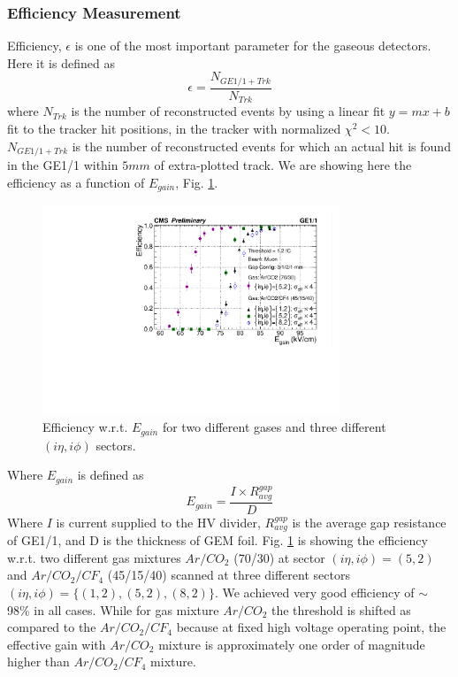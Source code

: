 \subsubsection{Efficiency Measurement}
Efficiency, $\epsilon$ is one of the most important parameter for the gaseous detectors. Here it is defined as 
\begin{equation}
\epsilon = \frac{N_{GE1/1+Trk}}{N_{Trk}}
\end{equation}
where $N_{Trk}$ is the number of reconstructed events by using a linear fit $y = mx + b$ fit to the tracker hit positions, in the tracker with normalized $\chi^2<10$.
$N_{GE1/1+Trk}$ is the number of reconstructed events for which an actual hit is found in the GE1/1 within $5mm$ of extra-plotted track.
We are showing here the efficiency as a function of $E_{gain}$, Fig. \ref{Efficiency}. 
\begin{figure}[!htbp]
\centering
\includegraphics[width=3.5in]{figures/GEM/EfficiencyPlot_wrt_EGain_wError4times_2gas.pdf}
\caption{Efficiency w.r.t. $E_{gain}$ for two different gases and three different $(i\eta,i\phi)$ sectors.}
\label{Efficiency}
\end{figure}
Where $E_{gain}$ is defined as
\begin{equation}
E_{gain} = \frac{I\times R_{avg}^{gap}}{D}
\end{equation}
Where $I$ is current supplied to the HV divider,
      $R_{avg}^{gap}$ is the average gap resistance of GE1/1,
      and D is the thickness of GEM foil.
      Fig. \ref{Efficiency} is showing the efficiency w.r.t. two different gas mixtures $Ar/CO_2$ (70/30) at sector $(i\eta,i\phi)=(5,2)$ and $Ar/CO_2/CF_4$ (45/15/40) scanned at three different sectors $(i\eta,i\phi)=\{(1,2),(5,2),(8,2)\}$. We achieved very good efficiency of $\sim$ 98\% in all cases. While for gas mixture $Ar/CO_2$ the threshold is shifted as compared to the $Ar/CO_2/CF_4$ because at fixed high voltage operating point, the effective gain with $Ar/CO_2$  mixture is approximately one order of magnitude higher than $Ar/CO_2/CF_4$ mixture.
      

